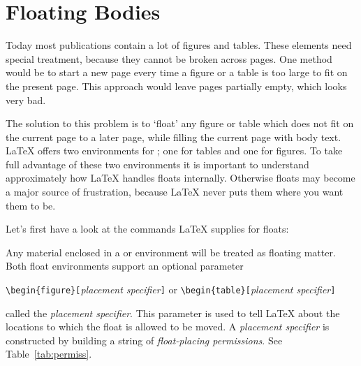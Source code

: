 \section{Floating Bodies}
Today most publications contain a lot of figures and tables. These
elements need special treatment, because they cannot be broken across
pages.  One method would be to start a new page every time a figure or
a table is too large to fit on the present page. This approach would
leave pages partially empty, which looks very bad.

The solution to this problem is to `float' any figure or table which
does not fit on the current page to a later page, while filling the
current page with body text. \LaTeX{} offers two environments for
; one for tables and  one for figures.  To
take full advantage of these two environments it is important to
understand approximately how \LaTeX{} handles floats internally.
Otherwise floats may become a major source of frustration, because
\LaTeX{} never puts them where you want them to be.

\bigskip
Let's first have a look at the commands \LaTeX{} supplies
for floats:

Any material enclosed in a  or  environment will
be treated as floating matter. Both float environments support an optional
parameter
\begin{lscommand}
\verb|\begin{figure}[|\emph{placement specifier}\verb|]| or
\verb|\begin{table}[|\emph{placement specifier}\verb|]|
\end{lscommand}
\noindent called the \emph{placement specifier}. This parameter
is used to tell \LaTeX{} about the locations to which the float
is allowed to be moved.  A \emph{placement specifier} is constructed by building a string
of \emph{float-placing permissions}. See Table~\ref{tab:permiss}.

